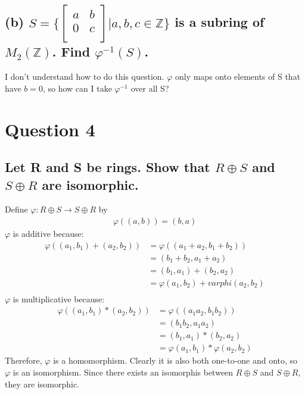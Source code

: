 \documentclass{article}
\begin{document}
\subsection*{(b) \(S = \bigg\{
\begin{bmatrix}
	a & b\\
	0 & c\\
\end{bmatrix} | a,b,c \in \mathds{Z} \bigg\}\) is a subring of \(M_2(\mathds{Z})\). Find \(\varphi^{-1}(S)\).}
I don't understand how to do this question. \(\varphi\) only maps onto elements of S that have \(b = 0\), so how can I take \(\varphi^{-1}\) over all S?
\section*{Question 4}
\subsection{Let R and S be rings. Show that \(R \oplus S\) and \(S \oplus R\) are isomorphic.}
Define \(\varphi : R \oplus S \rightarrow S \oplus R\) by
\begin{align*}
\varphi((a,b)) = (b,a)
\end{align*}
\(\varphi\) is additive because:
\begin{align*}
\varphi((a_1, b_1) + (a_2,b_2)) &= \varphi((a_1 + a_2, b_1 + b_2))\\
&= (b_1 + b_2, a_1 + a_2)\\
&= (b_1, a_1) + (b_2, a_2)\\
&= \varphi(a_1, b_2) + varphi(a_2, b_2)\\
\end{align*}
\(\varphi\) is multiplicative because:
\begin{align*}
\varphi((a_1, b_1)*(a_2, b_2)) &= \varphi((a_1a_2, b_1b_2))\\
&= (b_1b_2, a_1a_2)\\
&= (b_1, a_1) * (b_2, a_2)\\
&= \varphi(a_1, b_1)*\varphi(a_2, b_2)
\end{align*}
Therefore, \(\varphi\) is a homomorphism. Clearly it is also both one-to-one and onto, so \(\varphi\) is an isomorphism. Since there exists an isomorphis between \(R \oplus S\) and \(S \oplus R\), they are isomorphic.
\end{document}
